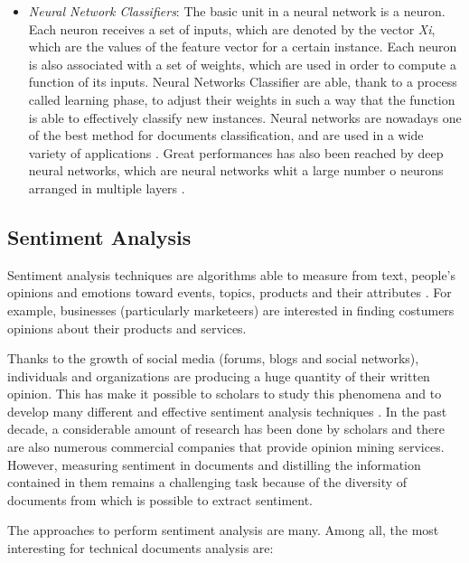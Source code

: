 \documentclass[b5paper,]{book}
\theoremstyle{definition}
\theoremstyle{definition}
\theoremstyle{definition}
\theoremstyle{remark}
\begin{document}
\begin{itemize}
  \citep{pop2006approach}.
\item
  \emph{Neural Network Classifiers}: The basic unit in a neural network
  is a neuron. Each neuron receives a set of inputs, which are denoted
  by the vector \emph{Xi}, which are the values of the feature vector
  for a certain instance. Each neuron is also associated with a set of
  weights, which are used in order to compute a function of its inputs.
  Neural Networks Classifier are able, thank to a process called
  learning phase, to adjust their weights in such a way that the
  function is able to effectively classify new instances. Neural
  networks are nowadays one of the best method for documents
  classification, and are used in a wide variety of applications
  \citep{manevitz2007one}. Great performances has also been reached by
  deep neural networks, which are neural networks whit a large number o
  neurons arranged in multiple layers
  \citep{lai2015recurrent, kim2014convolutional}.
\end{itemize}

\subsection{Sentiment Analysis}\label{sotatoolsmodelsentanal}

Sentiment analysis techniques are algorithms able to measure from text,
people's opinions and emotions toward events, topics, products and their
attributes \citep{pang2008opinion}. For example, businesses
(particularly marketeers) are interested in finding costumers opinions
about their products and services.

Thanks to the growth of social media (forums, blogs and social
networks), individuals and organizations are producing a huge quantity
of their written opinion. This has make it possible to scholars to study
this phenomena and to develop many different and effective sentiment
analysis techniques \citep{liu2012survey}. In the past decade, a
considerable amount of research has been done by scholars and there are
also numerous commercial companies that provide opinion mining services.
However, measuring sentiment in documents and distilling the information
contained in them remains a challenging task because of the diversity of
documents from which is possible to extract sentiment.

The approaches to perform sentiment analysis are many. Among all, the
most interesting for technical documents analysis are:
\end{document}

